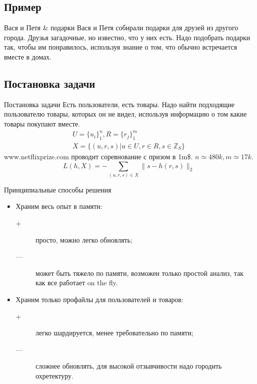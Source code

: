 \documentclass[14pt, fleqn, xcolor={dvipsnames, table}]{beamer}
\begin{document}
\subsection{Пример} %
\begin{frame}{Вася и Петя \& подарки}
Вася и Петя собирали подарки для друзей из другого города. Друзья загадочные, но известно, что у них есть. Надо подобрать подарки так, чтобы им понравилось, используя знание о том, что обычно встречается вместе в домах.
\end{frame}

\subsection{Постановка задачи} %
\begin{frame}{Постановка задачи}
Есть пользователи, есть товары. Надо найти подходящие пользователю товары, которых он не видел, используя информацию о том какие товары покупают вместе.
$$\begin{array}{l}
U = \{u_i\}_1^n, R = \{r_j\}_1^m \\
X = \{(u, r, s) | u \in U, r \in R, s \in \mathbb{Z}_S \}
\end{array}$$
{\color{blue}www.netflixprize.com} проводит соревнование с призом в 1m\$. $n \simeq 480k, m \simeq 17k$.
$$
L(h, X) = -\sum_{(u,r,s) \in X} \|s - h(r,s)\|_2
$$
\end{frame}

\begin{frame}{Принципиальные способы решения}
\begin{itemize}
  \item Храним весь опыт в памяти:
  \begin{description}
    \item[\color{green}+] просто, можно легко обновлять;
    \item[\color{red}---] может быть тяжело по памяти, возможен только простой анализ, так как все работает on the fly.
  \end{description}
  \item Храним только профайлы для пользователей и товаров:
  \begin{description}
    \item[\color{green}+] легко шардируется, менее требовательно по памяти;
    \item[\color{red}---] сложнее обновлять, для высокой отзывчивости надо городить охретектуру.
  \end{description}
\end{itemize}
\end{frame}
\end{document}

